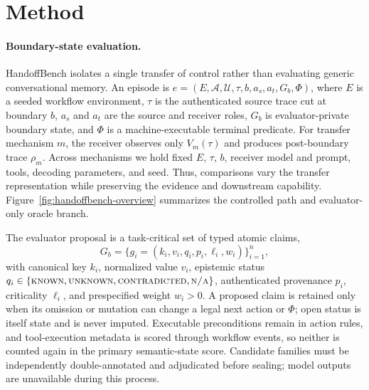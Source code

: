 \section{Method}
\label{sec:method}

\paragraph{Boundary-state evaluation.}
HandoffBench isolates a single transfer of control rather than evaluating generic conversational memory.  An episode is
$e=(E,\mathcal{A},\mathcal{U},\tau,b,a_s,a_t,G_b,\Phi)$, where $E$ is a seeded workflow environment, $\tau$ is the authenticated source trace cut at boundary $b$, $a_s$ and $a_t$ are the source and receiver roles, $G_b$ is evaluator-private boundary state, and $\Phi$ is a machine-executable terminal predicate.  For transfer mechanism $m$, the receiver observes only $V_m(\tau)$ and produces post-boundary trace $\rho_m$.  Across mechanisms we hold fixed $E$, $\tau$, $b$, receiver model and prompt, tools, decoding parameters, and seed.  Thus, comparisons vary the transfer representation while preserving the evidence and downstream capability. Figure~\ref{fig:handoffbench-overview} summarizes the controlled path and evaluator-only oracle branch.

The evaluator proposal is a task-critical set of typed atomic claims,
\begin{equation}
G_b=\{g_i=(k_i,v_i,q_i,p_i,\ell_i,w_i)\}_{i=1}^{n},
\end{equation}
with canonical key $k_i$, normalized value $v_i$, epistemic status $q_i\in\{\textsc{known},\textsc{unknown},\textsc{contradicted},\textsc{n/a}\}$, authenticated provenance $p_i$, criticality $\ell_i$, and prespecified weight $w_i>0$.  A proposed claim is retained only when its omission or mutation can change a legal next action or $\Phi$; open status is itself state and is never imputed.  Executable preconditions remain in action rules, and tool-execution metadata is scored through workflow events, so neither is counted again in the primary semantic-state score.  Candidate families must be independently double-annotated and adjudicated before sealing; model outputs are unavailable during this process.

